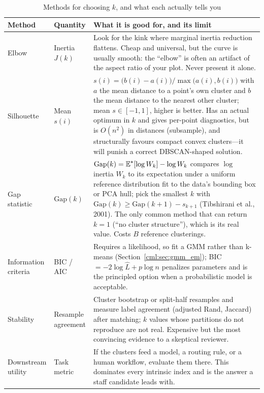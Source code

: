 \begin{table}[H]
\centering
\small
\caption{Methods for choosing $k$, and what each actually tells you}
\label{cml:tab:choosing_k}
\begin{tabularx}{\textwidth}{@{}l l X@{}}
\toprule
\textbf{Method} & \textbf{Quantity} & \textbf{What it is good for, and its limit} \\
\midrule
Elbow & Inertia $J(k)$ & Look for the kink where marginal inertia reduction flattens. Cheap and universal, but the curve is usually smooth: the ``elbow'' is often an artifact of the aspect ratio of your plot. Never present it alone. \\
Silhouette & Mean $s(i)$ & $s(i) = \big(b(i)-a(i)\big)/\max\!\big(a(i),b(i)\big)$ with $a$ the mean distance to a point's own cluster and $b$ the mean distance to the nearest other cluster; mean $s \in [-1,1]$, higher is better. Has an actual optimum in $k$ and gives per-point diagnostics, but is $O(n^2)$ in distances (subsample), and structurally favours compact convex clusters---it will punish a correct DBSCAN-shaped solution. \\
Gap statistic & $\mathrm{Gap}(k)$ & $\mathrm{Gap}(k) = \operatorname{\mathbb{E}}^\star[\log W_k] - \log W_k$ compares $\log$ inertia $W_k$ to its expectation under a uniform reference distribution fit to the data's bounding box or PCA hull; pick the smallest $k$ with $\mathrm{Gap}(k) \ge \mathrm{Gap}(k{+}1) - s_{k+1}$ (Tibshirani et al., 2001). The only common method that can return $k=1$ (``no cluster structure''), which is its real value. Costs $B$ reference clusterings. \\
Information criteria & BIC / AIC & Requires a likelihood, so fit a GMM rather than k-means (Section~\ref{cml:sec:gmm_em}); BIC $= -2\log \hat{L} + p \log n$ penalizes parameters and is the principled option when a probabilistic model is acceptable. \\
Stability & Resample agreement & Cluster bootstrap or split-half resamples and measure label agreement (adjusted Rand, Jaccard) after matching; $k$ values whose partitions do not reproduce are not real. Expensive but the most convincing evidence to a skeptical reviewer. \\
Downstream utility & Task metric & If the clusters feed a model, a routing rule, or a human workflow, evaluate them there. This dominates every intrinsic index and is the answer a staff candidate leads with. \\
\bottomrule
\end{tabularx}
\end{table}

